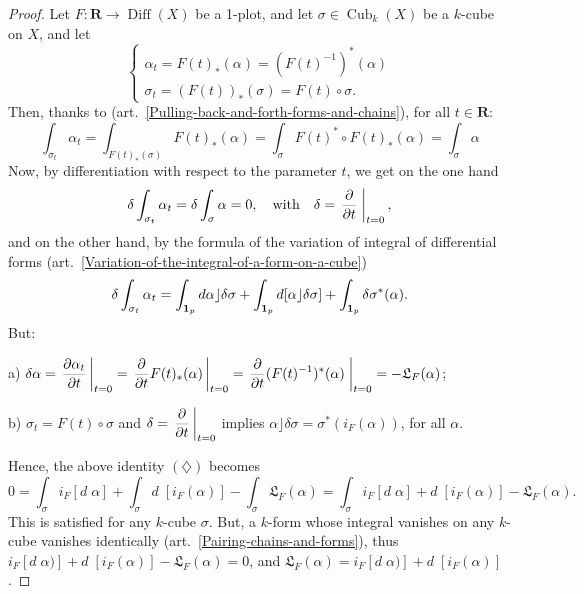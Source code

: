 \documentclass[11pt,reqno]{amsart}
\theoremstyle{definition}
\renewcommand{\over}{\above .2pt}
\newcommand{\RR}{{\mathbf R}}
\def \F{{F}}
\def \X{{X}}
\newcommand{\fL}{{\mathfrak  L}}
\newcommand{\art}[1]{{(art.~\ref{#1})}}
\newcommand{\DCubes}[1]{\operatorname{Cub}_{#1}}
\newcommand{\Diff}{\operatorname{Diff}}
\newcommand{\DLie}{{\fL}}
\newcommand{\id}{{\bf 1}}
\begin{document}
  \begin{proof}
    Let $\F: \RR \to \Diff(\X)$ be a 1-plot, and let $\sigma
      \in \DCubes{k}(\X)$ be a $k$-cube on $\X$, and let
    $$
      \left\{ \begin{array}{l} \alpha_t =
      \F(t)_*(\alpha) = (\F(t)^{-1})^*(\alpha)\\  \sigma_t
      = (\F(t))_*(\sigma) = \F(t) \circ \sigma.
      \end{array}
      \right.
      $$
    Then, thanks to
    \art{Pulling-back-and-forth-forms-and-chains}, for all $t \in \RR$:
    $$ \int_{\sigma_t}\alpha_t = 
      \int_{\F(t)_*(\sigma)}\F(t)_*(\alpha) =  \int_\sigma
      \F(t)^* \circ \F(t)_*(\alpha) = 
      \int_\sigma \alpha  $$ 
    Now, by differentiation with respect to the parameter
    $t$, we get on the one hand
    $$
      \delta\int_{\sigma_t}\alpha_t = \delta\int_{\sigma}\alpha = 0, \quad
      \mbox{with}
      \quad 
      \delta = \left.{\partial \over \partial t}\;\right\vert_{t
      = 0}, $$ 
    and on the other hand, by the formula of the variation
    of integral of differential forms
    \art{Variation-of-the-integral-of-a-form-on-a-cube} 
    \begin{equation}\renewcommand{\theequation}{$\diamondsuit$}
      \delta\int_{\sigma_t}\alpha_t = \int_{\id_p}
      d\alpha \rfloor \delta \sigma + \int_{\id_p}
      d[\alpha \rfloor \delta \sigma] + \int_{\id_p}
      \delta\sigma^*(\alpha).
    \end{equation}
    But:
    
    a) $\displaystyle{ \delta \alpha = 
        \left.{\partial \alpha_t \over \partial
        t} \, \right\vert_{t = 0} = \left.{\partial \over \partial
        t}
        \F(t)_*(\alpha) \, \right\vert_{t = 0} = \left.{\partial
        \over \partial t}
        (\F(t)^{-1})^*(\alpha)\;\right\vert_{t = 0}
        = - \DLie_\F(\alpha)}$;
     
      b) $\sigma_t = \F(t) \circ \sigma$
        and $\delta = \displaystyle {\left.{\partial \over \partial t} \, \right\vert_{t = 0}}$ 
        implies
        $\alpha \rfloor \delta \sigma = \sigma^*(i_\F(\alpha))$, for all $\alpha$.

    Hence, the above
    identity $(\diamondsuit)$ becomes
    $$
      0 = \int_\sigma i_\F[d\;\alpha] +
      \int_{\sigma}d\;[i_\F(\alpha)] -
      \int_\sigma\DLie_\F(\alpha) = \int_\sigma
      i_\F[d\;\alpha] + d\;[i_\F(\alpha)]-
      \DLie_\F(\alpha).
      $$
    This is
    satisfied for any $k$-cube $\sigma$. But, a
    $k$-form whose integral vanishes on any $k$-cube vanishes
    identically \art{Pairing-chains-and-forms}, thus
    $i_\F[d\;\alpha)] + d\;[i_\F(\alpha)] -
      \DLie_\F(\alpha) = 0$, and $\DLie_\F(\alpha) = 
        i_\F[d\;\alpha)] + d\;[i_\F(\alpha)]$.
  \end{proof}
  
\end{document}

